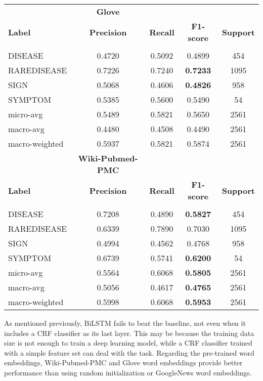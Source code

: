 \documentclass[preprint,12pt]{elsarticle}
\begin{document}
\begin{table}[!htbp]
\begin{tabular}{lcccc}
\hline

& \multicolumn{1}{c}{\textbf{Glove}} \\
{\bf Label} & {\bf Precision} &
{\bf Recall} &
{\bf F1-score} & {\bf Support} \\
\hline\\[-8pt]
DISEASE	&	0.4720	&	0.5092	&	0.4899	&	454\\
RAREDISEASE	&	0.7226	&	0.7240	&	\bf 0.7233	&	1095\\
SIGN	&	0.5068	&	0.4606	&	\bf 0.4826	&	958\\
SYMPTOM	&	0.5385	&	0.5600	&	0.5490	&	54\\
micro-avg	&	0.5489	&	0.5821	&	0.5650	&	2561\\
macro-avg	&	0.4480	&	0.4508	&	0.4490	&	2561\\
macro-weighted	&	0.5937	&	0.5821	&	0.5874	&	2561\\

\hline

& \multicolumn{1}{c}{\textbf{Wiki-Pubmed-PMC}} \\
{\bf Label} & {\bf Precision} &
{\bf Recall} &
{\bf F1-score} & {\bf Support} \\
\hline\\[-8pt]
DISEASE	&	0.7208	&	0.4890	&	\bf 0.5827	&	454\\
RAREDISEASE	&	0.6339	&	0.7890	&	0.7030	&	1095\\
SIGN	&	0.4994	&	0.4562	&	0.4768	&	958\\
SYMPTOM	&	0.6739	&	0.5741	&	\bf 0.6200	&	54\\
micro-avg	&	0.5564	&	0.6068	&	\bf 0.5805	&	2561\\
macro-avg	&	0.5056	&	0.4617	&	\bf 0.4765	&	2561\\
macro-weighted	&	0.5998	&	0.6068	&	\bf 0.5953	&	2561\\

\hline
\end{tabular}
\end{table}



As mentioned previously, BiLSTM fails to beat the baseline, not even when it includes a CRF classifier as its last layer. This may be because the training data size is not enough to train a deep learning model, while a CRF classifier trained with a simple feature set can deal with the task. 
Regarding the pre-trained word embeddings, Wiki-Pubmed-PMC and Glove word embeddings provide better performance than using random initialization or GoogleNews word embeddings. 
\end{document}
